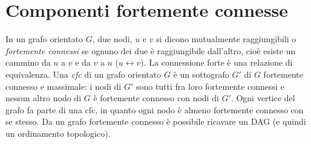 \documentclass[11pt]{book}
\begin{document}
\section{Componenti fortemente connesse}
In un grafo orientato $G$, due nodi, $u$ e $v$ si dicono mutualmente raggiungibili o \textit{fortemente connessi} se 
ognuno dei due è raggiungibile dall'altro, cioè esiste un cammino da $u$ a $v$ e da $v$ a $u$ ($u \leftrightarrow v$).
La connessione forte è una relazione di equivalenza.
Una \textit{cfc} di un grafo orientato $G$ è un sottografo $G'$ di $G$ fortemente connesso e massimale: i nodi di $G'$ sono 
tutti fra loro fortemente connessi e nessun altro nodo di $G$ è fortemente connesso con nodi di $G'$. Ogni vertice del grafo 
fa parte di una cfc, in quanto ogni nodo è almeno fortemente connesso con se stesso. Da un grafo fortemente connesso è possibile 
ricavare un DAG (e quindi un ordinamento topologico). 
\end{document}
